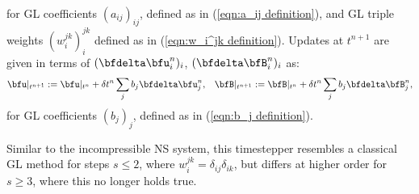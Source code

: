 \begin{example}
\begin{align}
        \end{align}
        for GL coefficients $(a_{ij})_{ij}$, defined as in (\ref{eqn:a_ij definition}), and GL triple weights $(w_{i}^{jk})_{i}^{jk}$ defined as in (\ref{eqn:w_i^jk definition}). Updates at $t^{n + 1}$ are given in terms of $(\bfdelta\bfu_{i}^{n})_{i}$, $(\bfdelta\bfB_{i}^{n})_{i}$ as:
        \begin{align}
            \bfu|_{t^{n + 1}}  :=  \bfu|_{t^{n}} + \delta t^{n}\sum_{j}b_{j}\bfdelta\bfu_{j}^{n},  &&
            \bfB|_{t^{n + 1}}  :=  \bfB|_{t^{n}} + \delta t^{n}\sum_{j}b_{j}\bfdelta\bfB_{j}^{n},
        \end{align}
        for GL coefficients $(b_{j})_{j}$, defined as in (\ref{eqn:b_j definition}).

        Similar to the incompressible NS system, this timestepper resembles a classical GL method for steps $s \leq 2$, where $w_{i}^{jk} = \delta_{ij}\delta_{ik}$, but differs at higher order for $s \geq 3$, where this no longer holds true.


\end{example}
